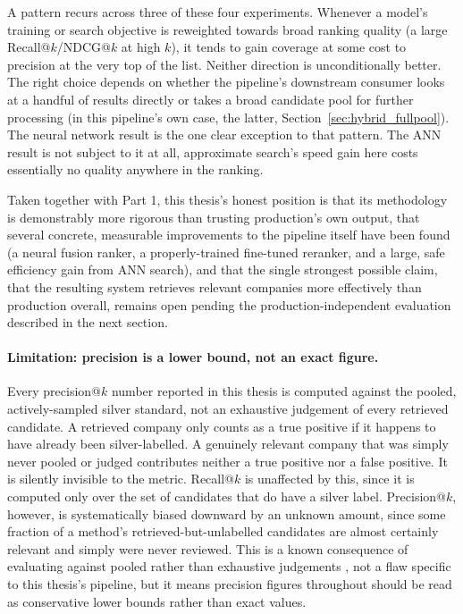 \documentclass[a4paper,oneside,bibliography=totoc]{scrbook}
\begin{document}
A pattern recurs across three of these four experiments. Whenever a model's training or search objective is reweighted towards broad ranking quality (a large Recall@$k$/NDCG@$k$ at high $k$), it tends to gain coverage at some cost to precision at the very top of the list. Neither direction is unconditionally better. The right choice depends on whether the pipeline's downstream consumer looks at a handful of results directly or takes a broad candidate pool for further processing (in this pipeline's own case, the latter, Section~\ref{sec:hybrid_fullpool}). The neural network result is the one clear exception to that pattern. The ANN result is not subject to it at all, approximate search's speed gain here costs essentially no quality anywhere in the ranking.

Taken together with Part 1, this thesis's honest position is that its methodology is demonstrably more rigorous than trusting production's own output, that several concrete, measurable improvements to the pipeline itself have been found (a neural fusion ranker, a properly-trained fine-tuned reranker, and a large, safe efficiency gain from ANN search), and that the single strongest possible claim, that the resulting system retrieves relevant companies more effectively than production overall, remains open pending the production-independent evaluation described in the next section.

\paragraph{Limitation: precision is a lower bound, not an exact figure.} Every precision@$k$ number reported in this thesis is computed against the pooled, actively-sampled silver standard, not an exhaustive judgement of every retrieved candidate. A retrieved company only counts as a true positive if it happens to have already been silver-labelled. A genuinely relevant company that was simply never pooled or judged contributes neither a true positive nor a false positive. It is silently invisible to the metric. Recall@$k$ is unaffected by this, since it is computed only over the set of candidates that do have a silver label. Precision@$k$, however, is systematically biased downward by an unknown amount, since some fraction of a method's retrieved-but-unlabelled candidates are almost certainly relevant and simply were never reviewed. This is a known consequence of evaluating against pooled rather than exhaustive judgements \citep{baryossef2008random, lu2016effect}, not a flaw specific to this thesis's pipeline, but it means precision figures throughout should be read as conservative lower bounds rather than exact values.
\end{document}

